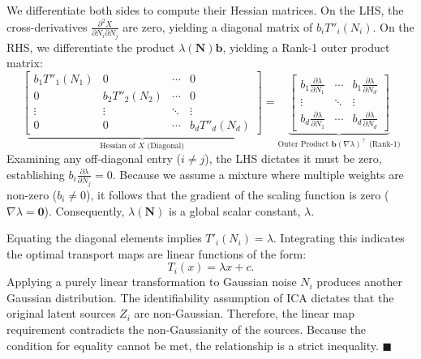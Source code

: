 \documentclass{tpm2026} %
\begin{document}
We differentiate both sides to compute their Hessian matrices. On the LHS, the cross-derivatives $\frac{\partial^2 X}{\partial N_i \partial N_j}$ are zero, 
yielding a diagonal matrix of $b_i T''_i(N_i)$. On the RHS, we differentiate the product $\lambda(\mathbf{N}) \mathbf{b}$, yielding a Rank-1 outer product matrix:
\begin{equation}
    \underbrace{
    \begin{bmatrix} 
    b_1 T''_1(N_1) & 0 & \cdots & 0 \\
    0 & b_2 T''_2(N_2) & \cdots & 0 \\
    \vdots & \vdots & \ddots & \vdots \\
    0 & 0 & \cdots & b_d T''_d(N_d)
    \end{bmatrix}
    }_{\text{Hessian of } X \text{ (Diagonal)}}
    =
    \underbrace{
    \begin{bmatrix}
    b_1 \frac{\partial \lambda}{\partial N_1} & \cdots & b_1 \frac{\partial \lambda}{\partial N_d} \\
    \vdots & \ddots & \vdots \\
    b_d \frac{\partial \lambda}{\partial N_1} & \cdots & b_d \frac{\partial \lambda}{\partial N_d}
    \end{bmatrix}
    }_{\text{Outer Product } \mathbf{b} (\nabla \lambda)^\top \text{ (Rank-1)}}
\end{equation}
Examining any off-diagonal entry ($i \neq j$), the LHS dictates it must be zero, establishing $b_i \frac{\partial \lambda}{\partial N_j} = 0$. 
Because we assume a mixture where multiple weights are non-zero ($b_i \neq 0$), it follows that the gradient of the scaling function is 
zero ($\nabla \lambda = \mathbf{0}$). Consequently, $\lambda(\mathbf{N})$ is a global scalar constant, $\lambda$.

Equating the diagonal elements implies $T'_i(N_i) = \lambda$. Integrating this indicates the optimal transport maps are linear functions of the form:
\begin{equation}
    T_i(x) = \lambda x + c.
\end{equation}
Applying a purely linear transformation to Gaussian noise $N_i$ produces another Gaussian distribution. 
The identifiability assumption of ICA dictates that the original latent sources $Z_i$ are non-Gaussian. 
Therefore, the linear map requirement contradicts the non-Gaussianity of the sources. 
Because the condition for equality cannot be met, the relationship is a strict inequality. $\blacksquare$
\end{document}
